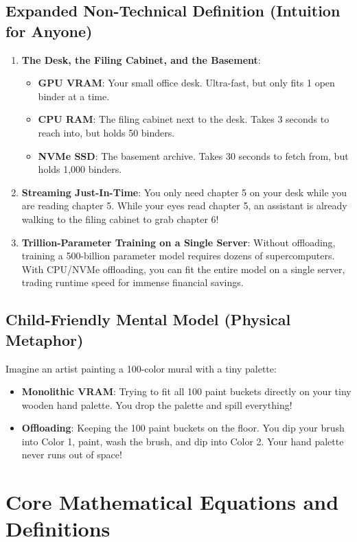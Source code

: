 \documentclass[11pt,a4paper]{article}
\theoremstyle{definition}
\begin{document}
\subsection{Expanded Non-Technical Definition (Intuition for Anyone)}
\begin{enumerate}
    \item \textbf{The Desk, the Filing Cabinet, and the Basement}:
    \begin{itemize}
        \item \textbf{GPU VRAM}: Your small office desk. Ultra-fast, but only fits 1 open binder at a time.
        \item \textbf{CPU RAM}: The filing cabinet next to the desk. Takes 3 seconds to reach into, but holds 50 binders.
        \item \textbf{NVMe SSD}: The basement archive. Takes 30 seconds to fetch from, but holds 1,000 binders.
    \end{itemize}
    \item \textbf{Streaming Just-In-Time}: You only need chapter 5 on your desk while you are reading chapter 5. While your eyes read chapter 5, an assistant is already walking to the filing cabinet to grab chapter 6!
    \item \textbf{Trillion-Parameter Training on a Single Server}: Without offloading, training a 500-billion parameter model requires dozens of supercomputers. With CPU/NVMe offloading, you can fit the entire model on a single server, trading runtime speed for immense financial savings.
\end{enumerate}

\subsection{Child-Friendly Mental Model (Physical Metaphor)}
Imagine an artist painting a 100-color mural with a tiny palette:
\begin{itemize}
    \item \textbf{Monolithic VRAM}: Trying to fit all 100 paint buckets directly on your tiny wooden hand palette. You drop the palette and spill everything!
    \item \textbf{Offloading}: Keeping the 100 paint buckets on the floor. You dip your brush into Color 1, paint, wash the brush, and dip into Color 2. Your hand palette never runs out of space!
\end{itemize}

\section{Core Mathematical Equations and Definitions}
\end{document}
